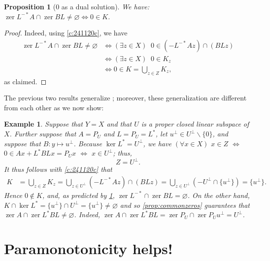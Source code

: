 \documentclass{article}
\providecommand{\siff}{\Leftrightarrow}
\newcommand{\zer}{\ensuremath{\operatorname{zer}}}
\newtheorem{proposition}[theorem]{Proposition}
\newtheorem{example}[theorem]{Example}
\begin{document}
\begin{proposition}[$0$ as a dual solution]
\label{prop:commonzeros2}
We have:  
$\zer L^{-*}A\cap \zer BL\neq \varnothing \siff 0\in K$. 
\end{proposition}
\begin{proof}
Indeed, using \cref{c:241120c}, we have 
\begin{subequations}
\begin{align}
\zer L^{-*}A\cap \zer BL\neq \varnothing
&\siff (\exists z\in X)\;\; 0\in (-L^{-*}Az) \cap  (BLz)\\
&\siff (\exists z\in X)\;\; 0\in K_z\\
&\siff 0\in K = \bigcup_{z\in Z} K_z, 
\end{align}
\end{subequations}
as claimed. 
\end{proof}

The previous two results generalize \cite[Proposition~2.10]{BBHM};
moreover, these generalization are different from each other 
as we now show:


\begin{example}  \label{ex:common0vs0inK}
Suppose that $Y=X$ and that $U$ is a proper closed linear subspace of $X$.
Further suppose that $A=P_U$ and $L=P_U=L^*$,
let $u^\perp\in U^\perp\smallsetminus\{0\}$, 
and suppose that 
$B\colon y\mapsto u^\perp$. 
Because $\ker L^*=U^\perp$, we have 
$(\forall x\in X)$ 
$x\in Z$
$\siff$
$0\in Ax+L^*BLx = P_Ux$
$\siff$
$x\in U^\perp$; thus, 
\begin{equation}
Z = U^\perp.
\end{equation}
It thus follows with \cref{c:241120c} that 
\begin{align}
K&=\bigcup_{z\in Z}K_z=\bigcup_{z\in U^\perp} (-L^{-*}Az)\cap (BLz)
= \bigcup_{z\in U^\perp} (-U^\perp\cap \{u^\perp\})=\{u^\perp\}.
\end{align}
Hence $0\notin K$, and, as predicted by 
\cref{prop:commonzeros2}, 
$\zer L^{-*}\cap\zer BL=\varnothing$. 
On the other hand, 
$K\cap \ker L^* = \{u^\perp\}\cap U^\perp = \{u^\perp\} \neq\varnothing$
and so 
\cref{prop:commonzeros} guarantees that 
$\zer A \cap \zer L^*BL\neq\varnothing$.
Indeed, $\zer A\cap \zer L^*BL = \zer P_U \cap \zer P_Uu^\perp = U^\perp$. 
\end{example}

\section{Paramonotonicity helps!}
\end{document}
